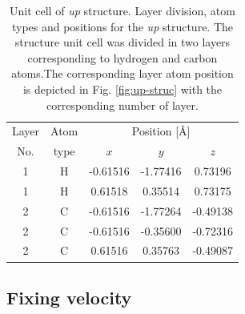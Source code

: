 \documentclass[prb,11pt,tightenlines,twocolumn,aps]{revtex4-1}
\begin{document}
\begin{table}[tb]
\center
\begin{tabular}{ccccc}\\
\hline
Layer & Atom & \multicolumn{3}{c}{Position [\AA]} \\
\cline{3-5}
No. & type & $x$ & $y$ & $z$  \\
\hline
1 & H & -0.61516 & -1.77416 &  0.73196 \\
1 & H &  0.61518 &  0.35514 &  0.73175 \\
2 & C & -0.61516 & -1.77264 & -0.49138 \\
2 & C & -0.61516 & -0.35600 & -0.72316 \\
2 & C &  0.61516 &  0.35763 & -0.49087 \\
\hline
\end{tabular}
\caption{Unit cell of \emph{up} structure. Layer division, atom types and
positions for the \emph{up} structure. The structure unit cell was divided in
two layers corresponding to hydrogen and carbon atoms.The corresponding layer
atom position is depicted in Fig. \ref{fig:up-struc} with the corresponding
number of layer.}
\label{tab:up-unitcell}
\end{table}




\subsection{Fixing velocity} %
\label{sec:res-fixvel}
\end{document}
